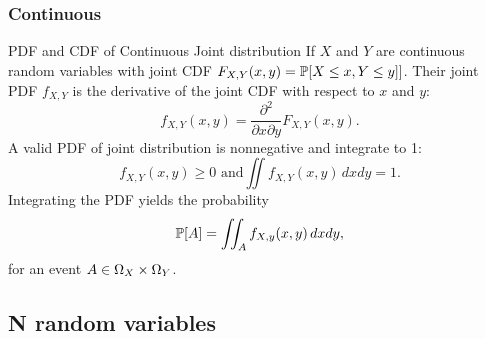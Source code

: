 \subsubsection{Continuous}

\begin{fact}{PDF and CDF of Continuous Joint distribution}{}
    If $X$ and $Y$ are continuous random variables with joint CDF $F_{X,Y}(x,y)=\mathbb{P}[X\le x,Y\le y]]$.
    Their joint PDF $f_{X,Y}$ is the derivative of the joint CDF with respect to $x$ and $y$:
    \begin{equation*}
        f_{X,Y}(x,y)=\frac{\partial^2}{\partial{x}\partial{y}}F_{X,Y}(x,y).
    \end{equation*}
    A valid PDF of joint distribution is nonnegative and integrate to 1:
    \begin{equation*}
        f_{X,Y}(x,y) \ge 0 \text{ and} \iint f_{X,Y}(x,y)\,dxdy=1.
    \end{equation*}
    Integrating the PDF yields the probability 
    \begin{equation*}
        \mathbb{P}[A]=\iint_{A}f_{X,y}(x,y)\,dxdy ,
    \end{equation*}
    for an event $A\in\Omega_X\times\Omega_Y$.
\end{fact}

\subsection{N random variables}

